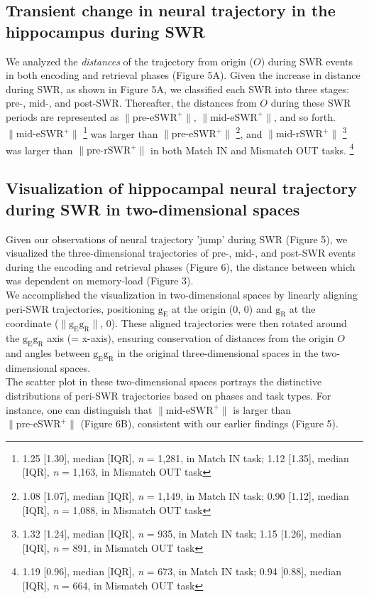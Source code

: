 \documentclass[final,3p,times,twocolumn]{elsarticle}
\newcommand{\REDSTARTS}{\color{red}}
\newcommand{\GREENENDS}{\color{black}}
\begin{document}
\begin{abstract\GREENENDS \REDSTARTS ll_Tables}
\subsection{Transient change in neural trajectory in the hippocampus during SWR}
We analyzed the \textit{distances} of the trajectory from origin ($O$) during SWR events in both encoding and retrieval phases (Figure 5A). Given the increase in distance during SWR, as shown in Figure 5A, we classified each SWR into three stages: pre-, mid-, and post-SWR. Thereafter, the distances from $O$ during these SWR periods are represented as $\mathrm{\lVert \text{pre-eSWR}^+ \rVert}$, $\mathrm{\lVert \text{mid-eSWR}^+ \rVert}$, and so forth.
\\
\indent
$\mathrm{\lVert \text{mid-eSWR}^+ \rVert}$
\footnote{1.25 [1.30], median [IQR], \textit{n} = 1,281, in Match IN task; 1.12 [1.35], median [IQR], \textit{n} = 1,163, in Mismatch OUT task}
was larger than $\mathrm{\lVert \text{pre-eSWR}^+ \rVert}$
\footnote{1.08 [1.07], median [IQR], \textit{n} = 1,149, in Match IN task; 0.90 [1.12], median [IQR], \textit{n} = 1,088, in Mismatch OUT task}, and $\mathrm{\lVert \text{mid-rSWR}^+ \rVert}$ 
\footnote{1.32 [1.24], median [IQR], \textit{n} = 935, in Match IN task; 1.15 [1.26], median [IQR], \textit{n} = 891, in Mismatch OUT task}
was larger than $\mathrm{\lVert \text{pre-rSWR}^+ \rVert}$ in both Match IN and Mismatch OUT tasks.
\footnote{1.19 [0.96], median [IQR], \textit{n} = 673, in Match IN task; 0.94 [0.88], median [IQR], \textit{n} = 664, in Mismatch OUT task}

\subsection{Visualization of hippocampal neural trajectory during SWR in two-dimensional spaces}
Given our observations of neural trajectory 'jump' during SWR (Figure 5), we visualized the three-dimensional trajectories of pre-, mid-, and post-SWR events during the encoding and retrieval phases (Figure 6), the distance between which was dependent on memory-load (Figure 3).
\\
\indent
We accomplished the visualization in two-dimensional spaces by linearly aligning peri-SWR trajectories, positioning $\mathrm{g_{E}}$ at the origin (0, 0) and $\mathrm{g_{R}}$ at the coordinate ($\mathrm{\lVert g_{E}g_{R} \rVert}$, 0). These aligned trajectories were then rotated around the $\mathrm{g_{E}g_{R}}$ axis (= x-axis), ensuring conservation of distances from the origin $O$ and angles between $\mathrm{g_{E}g_{R}}$ in the original three-dimensional spaces in the two-dimensional spaces.
\\
\indent
The scatter plot in these two-dimensional spaces portrays the distinctive distributions of peri-SWR trajectories based on phases and task types. For instance, one can distinguish that $\mathrm{\lVert \text{mid-eSWR}^+ \rVert}$ is larger than $\mathrm{\lVert \text{pre-eSWR}^+ \rVert}$ (Figure 6B), consistent with our earlier findings (Figure 5).


\end{abstract\GREENENDS \REDSTARTS ll_Tables}
\end{document}
